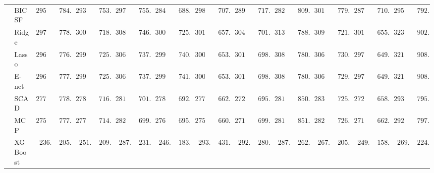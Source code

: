 \begin{tabular}{p{0.2cm}p{1cm}|p{0.6cm}p{0.6cm}|p{0.6cm}p{0.6cm}p{0.6cm}p{0.6cm}p{0.6cm}p{0.6cm}|p{0.6cm}p{0.6cm}p{0.6cm}p{0.6cm}p{0.6cm}p{0.6cm}|p{0.6cm}p{0.6cm}p{0.6cm}p{0.6cm}p{0.6cm}p{0.6cm}}
 & BIC SF  & $2951.76$ & $\phantom{0}784.90$ & $2933.16$ & $\phantom{0}753.68$ & $2979.63$ & $\phantom{0}755.13$ & $2846.57$ & $\phantom{0}688.43$ & $2988.18$ & $\phantom{0}707.78$ & $2890.98$ & $\phantom{0}717.42$ & $2826.24$ & $\phantom{0}809.69$ & $3019.70$ & $\phantom{0}779.22$ & $2875.94$ & $\phantom{0}710.50$ & $2953.19$ & $\phantom{0}792.28$ \\
 & Ridge  & $2977.85$ & $\phantom{0}778.14$ & $3009.38$ & $\phantom{0}718.48$ & $3087.92$ & $\phantom{0}746.63$ & $3009.50$ & $\phantom{0}725.84$ & $3013.87$ & $\phantom{0}657.20$ & $3045.43$ & $\phantom{0}701.60$ & $3137.18$ & $\phantom{0}788.02$ & $3092.40$ & $\phantom{0}721.86$ & $3011.63$ & $\phantom{0}655.71$ & $3236.02$ & $\phantom{0}902.18$ \\
 & Lasso  & $2968.70$ & $\phantom{0}776.01$ & $2997.76$ & $\phantom{0}725.75$ & $3061.34$ & $\phantom{0}737.42$ & $2999.97$ & $\phantom{0}740.78$ & $3001.85$ & $\phantom{0}653.98$ & $3013.21$ & $\phantom{0}698.27$ & $3081.30$ & $\phantom{0}780.43$ & $3061.91$ & $\phantom{0}730.15$ & $2973.05$ & $\phantom{0}649.07$ & $3213.22$ & $\phantom{0}908.17$ \\
 & E-net  & $2968.99$ & $\phantom{0}777.76$ & $2998.53$ & $\phantom{0}725.22$ & $3063.43$ & $\phantom{0}737.10$ & $2999.82$ & $\phantom{0}741.30$ & $3002.98$ & $\phantom{0}653.93$ & $3014.77$ & $\phantom{0}698.62$ & $3084.40$ & $\phantom{0}780.58$ & $3062.75$ & $\phantom{0}729.56$ & $2975.39$ & $\phantom{0}649.38$ & $3213.99$ & $\phantom{0}908.19$ \\
 & SCAD  & $2770.83$ & $\phantom{0}778.44$ & $2783.32$ & $\phantom{0}716.44$ & $2818.31$ & $\phantom{0}701.84$ & $2788.38$ & $\phantom{0}692.96$ & $2779.77$ & $\phantom{0}662.54$ & $2724.61$ & $\phantom{0}695.82$ & $2817.28$ & $\phantom{0}850.66$ & $2832.96$ & $\phantom{0}725.45$ & $2722.78$ & $\phantom{0}658.93$ & $2932.99$ & $\phantom{0}795.94$ \\
 & MCP  & $2752.32$ & $\phantom{0}777.89$ & $2770.50$ & $\phantom{0}714.07$ & $2825.19$ & $\phantom{0}699.88$ & $2768.36$ & $\phantom{0}695.18$ & $2759.76$ & $\phantom{0}660.63$ & $2713.18$ & $\phantom{0}699.23$ & $2813.45$ & $\phantom{0}851.56$ & $2820.90$ & $\phantom{0}726.26$ & $2718.68$ & $\phantom{0}662.70$ & $2927.29$ & $\phantom{0}797.79$ \\
 & XGBoost  & $\phantom{0}236.16$ & $\phantom{0}205.71$ & $\phantom{0}251.33$ & $\phantom{0}209.22$ & $\phantom{0}287.38$ & $\phantom{0}231.34$ & $\phantom{0}246.37$ & $\phantom{0}183.41$ & $\phantom{0}293.97$ & $\phantom{0}431.28$ & $\phantom{0}292.62$ & $\phantom{0}280.49$ & $\phantom{0}287.83$ & $\phantom{0}262.70$ & $\phantom{0}267.14$ & $\phantom{0}205.82$ & $\phantom{0}249.46$ & $\phantom{0}158.45$ & $\phantom{0}269.38$ & $\phantom{0}224.94$ \\

\end{tabular}
